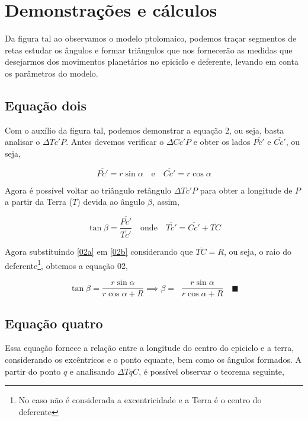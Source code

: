 \documentclass[10pt,a4paper,oneside]{article}
\author{marcos}
\DeclareMathOperator{\taninv}{tan^{-1}}
\begin{document}
\section{Demonstrações e cálculos}
Da figura tal ao observamos o modelo ptolomaico, podemos traçar segmentos de retas estudar os ângulos e formar triângulos que nos fornecerão as medidas que desejarmos dos movimentos planetários no epiciclo e deferente, levando em conta os parâmetros do modelo.

\subsection{Equação dois}
Com o auxílio da figura tal, podemos demonstrar a equação 2, ou seja, basta analisar o $\Delta Tc'P$. Antes devemos verificar o $\Delta Cc'P$ e obter os lados $\overline{Pc'}$ e $\overline{Cc'}$, ou seja,

\begin{equation}
\overline{Pc'}=r\sin\alpha \quad\mbox{e}\quad \overline{Cc'}=r\cos\alpha
\label{02a}
\end{equation}

Agora é possível voltar ao triângulo retângulo $\Delta Tc'P$ para obter a longitude de $P$  a partir da Terra ($T$) devida ao ângulo $\beta$, assim,

\begin{equation}
\tan\beta=\frac{\overline{Pc'}}{\overline{Tc'}} \quad\mbox{onde}\quad \overline{Tc'}=\overline{Cc'}+\overline{TC}
\label{02b}
\end{equation}

Agora substituindo \eqref{02a} em \eqref{02b} considerando que $\overline{TC}=R$, ou seja, o raio do deferente\footnote{No caso não é considerada a excentricidade e a Terra é o centro do deferente}, obtemos a equação 02,

\begin{equation}
\tan\beta=\frac{r\sin\alpha}{r\cos\alpha+R} \implies \beta=\taninv\frac{r\sin\alpha}{r\cos\alpha+R} \quad\blacksquare
\label{02c}
\end{equation}

\subsection{Equação quatro}
Essa equação fornece a relação entre a longitude do centro do epiciclo e a terra, considerando os excêntricos e o ponto equante, bem como os ângulos formados. A partir do ponto $q$ e analisando $\Delta TqC$, é possível observar o teorema seguinte,
\end{document}
